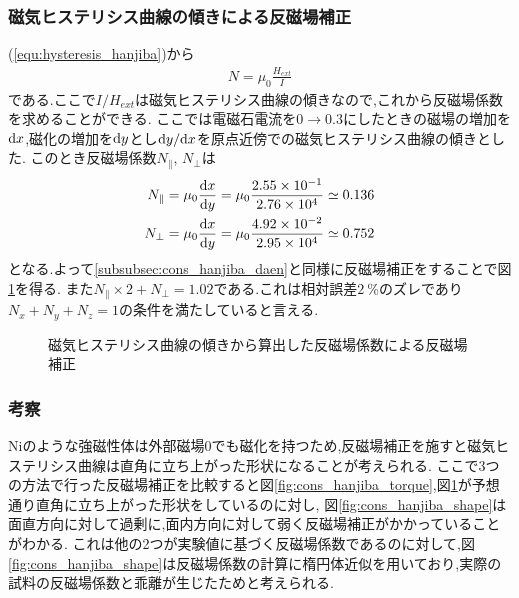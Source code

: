 \subsubsection{磁気ヒステリシス曲線の傾きによる反磁場補正}
(\ref{equ:hysteresis_hanjiba})から
\begin{align}
  N=\mu_0\frac{H_{ext}}{I}
\end{align}
である.ここで$I/H_{ext}$は磁気ヒステリシス曲線の傾きなので,これから反磁場係数を求めることができる.
ここでは電磁石電流を$0\rightarrow0.3$にしたときの磁場の増加を${\rm d}x$,磁化の増加を${\rm d}y$とし${\rm d}y/{\rm d}x$を原点近傍での磁気ヒステリシス曲線の傾きとした.
このとき反磁場係数$N_{\parallel}$, $N_{\perp}$は
\begin{align}
  N_{\parallel}=\mu_0\frac{{\rm d}x}{{\rm d}y}=\mu_0\frac{2.55\times10^{-1}}{2.76\times10^{4}}\simeq0.136\\
  N_{\perp}=\mu_0\frac{{\rm d}x}{{\rm d}y}=\mu_0\frac{4.92\times10^{-2}}{2.95\times10^{4}}\simeq0.752
\end{align}
となる.よって\ref{subsubsec:cons_hanjiba_daen}と同様に反磁場補正をすることで図\ref{fig:cons_hanjiba_slope}を得る.
また$N_{\parallel}\times2+N_{\perp}=1.02$である.これは相対誤差$2\ \%$のズレであり$N_x+N_y+N_z=1$の条件を満たしていると言える.
\begin{figure}[hptb]
  \begin{center}
    
    \caption{磁気ヒステリシス曲線の傾きから算出した反磁場係数による反磁場補正}
    \label{fig:cons_hanjiba_slope}
  \end{center}
\end{figure}
\subsubsection{考察}
Niのような強磁性体は外部磁場0でも磁化を持つため,反磁場補正を施すと磁気ヒステリシス曲線は直角に立ち上がった形状になることが考えられる.
ここで3つの方法で行った反磁場補正を比較すると図\ref{fig:cons_hanjiba_torque},図\ref{fig:cons_hanjiba_slope}が予想通り直角に立ち上がった形状をしているのに対し,
図\ref{fig:cons_hanjiba_shape}は面直方向に対して過剰に,面内方向に対して弱く反磁場補正がかかっていることがわかる.
これは他の2つが実験値に基づく反磁場係数であるのに対して,図\ref{fig:cons_hanjiba_shape}は反磁場係数の計算に楕円体近似を用いており,実際の試料の反磁場係数と乖離が生じたためと考えられる.